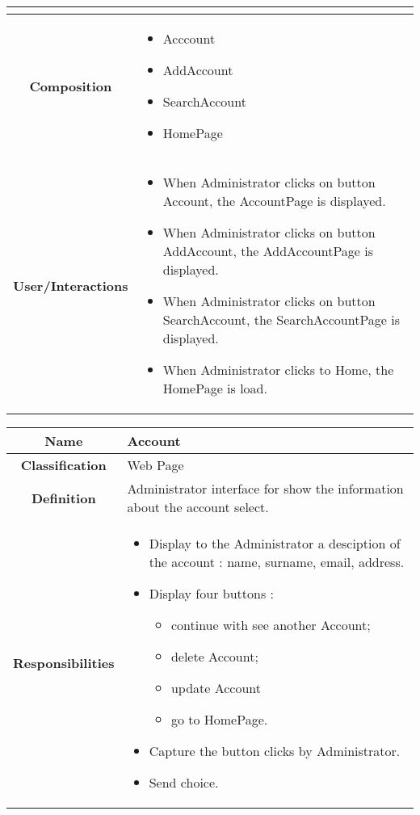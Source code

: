 \documentclass[11pt, a4paper,titlepage]{article}
\begin{document}
\begin{enumerate}
\begin{tabularx}{\textwidth}{| c | X |}
\begin{itemize}
	\end{itemize}
	\\
	\hline
	\textbf{Composition} &
	\begin{itemize}
		\item Acccount
		\item AddAccount
		\item SearchAccount
		\item HomePage
	\end{itemize}
	\\
	\hline
	\textbf{User/Interactions} &
	\begin{itemize}
		\item When Administrator clicks on button Account, the AccountPage is displayed.
		\item When Administrator clicks on button AddAccount, the AddAccountPage is displayed.
		\item When Administrator clicks on button SearchAccount, the SearchAccountPage is displayed.
		\item When Administrator clicks to Home, the HomePage is load.
	\end{itemize}
	\\
	\hline 
\end{tabularx}
\begin{tabularx}{\textwidth}{| c | X |}
	\hline
	\textbf{Name} &
	Account
	\\
	\hline
	\textbf{Classification} &
	Web Page
	\\
	\hline
	\textbf{Definition} &
	Administrator interface for show the information about the account select.\\
	\hline
	\textbf{Responsibilities} &
	\begin{itemize}
		\item Display to the Administrator a desciption of the account : name, surname, email, address.
		\item Display four buttons :
		\begin{itemize}
			\item continue with see another Account;
			\item delete Account;
			\item update Account
			\item go to HomePage.
		\end{itemize}
		\item Capture the button clicks by Administrator.
		\item Send choice.
	\end{itemize}
	\\

\end{tabularx}
\end{enumerate}
\end{document}
